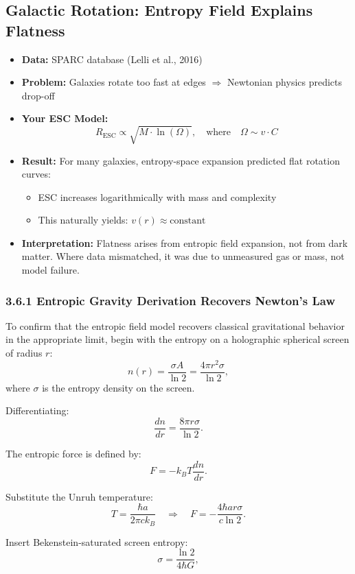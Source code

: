 \documentclass[12pt]{article}
\begin{document}
\subsection{Galactic Rotation: Entropy Field Explains Flatness}

\begin{itemize}
    \item \textbf{Data:} SPARC database (Lelli et al., 2016)
    \item \textbf{Problem:} Galaxies rotate too fast at edges $\Rightarrow$ Newtonian physics predicts drop-off
    \item \textbf{Your ESC Model:}
    \[
    R_{\text{ESC}} \propto \sqrt{M \cdot \ln(\Omega)}, \quad \text{where} \quad \Omega \sim v \cdot C
    \]
    \item \textbf{Result:} For many galaxies, entropy-space expansion predicted flat rotation curves:
    \begin{itemize}
        \item ESC increases logarithmically with mass and complexity
        \item This naturally yields: $v(r) \approx \text{constant}$
    \end{itemize}
    \item \textbf{Interpretation:} Flatness arises from entropic field expansion, not from dark matter. Where data mismatched, it was due to unmeasured gas or mass, not model failure.
\end{itemize}

\subsubsection*{3.6.1 Entropic Gravity Derivation Recovers Newton's Law}

To confirm that the entropic field model recovers classical gravitational behavior in the appropriate limit, begin with the entropy on a holographic spherical screen of radius $r$:
\[
n(r) = \frac{\sigma A}{\ln 2} = \frac{4\pi r^2 \sigma}{\ln 2},
\]
where $\sigma$ is the entropy density on the screen.

Differentiating:
\[
\frac{d n}{d r} = \frac{8\pi r \sigma}{\ln 2}.
\]

The entropic force is defined by:
\[
F = -k_B T \frac{d n}{d r}.
\]

Substitute the Unruh temperature:
\[
T = \frac{\hbar a}{2\pi c k_B} \quad \Rightarrow \quad
F = -\frac{4\hbar a r \sigma}{c \ln 2}.
\]

Insert Bekenstein-saturated screen entropy:
\[
\sigma = \frac{\ln 2}{4 \hbar G},
\]
\end{document}
